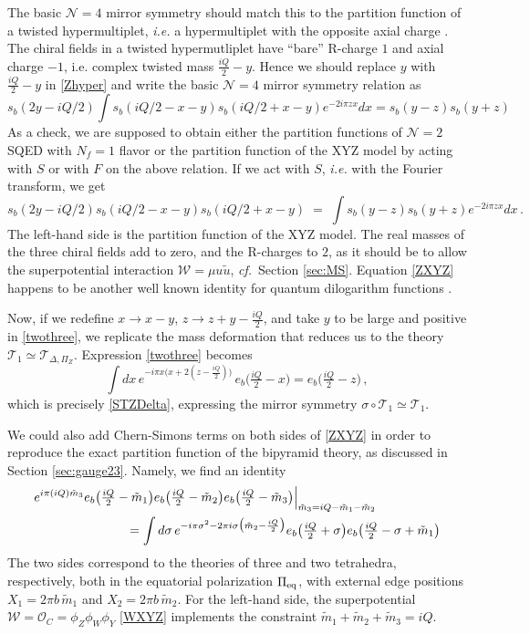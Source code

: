 \documentclass[hyper,letterpaper]{JHEP3}
\numberwithin{equation}{section}
\newcommand{\be}{\begin{equation}}
\newcommand{\ee}{\end{equation}}
\newcommand{\cf}{\emph{cf.}}
\newcommand{\CN}{\mathcal{N}}
\newcommand{\CO}{\mathcal{O}}
\newcommand{\CT}{\mathcal{T}}
\newcommand{\CW}{\mathcal{W}}
\begin{document}
The basic $\CN=4$ mirror symmetry should match this to the partition function of a twisted hypermultiplet,
{\it i.e.} a hypermultiplet with the opposite axial charge \cite{IS}.
The chiral fields in a twisted hypermutliplet have ``bare'' R-charge $1$ and axial charge $-1$, i.e. complex twisted mass $\tfrac{iQ}{2} -y$.
Hence we should replace $y$ with $\tfrac{iQ}{2}-y$ in \eqref{Zhyper}
and write the basic $\CN=4$ mirror symmetry relation as
%
\begin{equation} \label{twothree}
s_b(2 y - i Q/2) \int s_b(i Q/2-x -y) s_b(i Q/2+x -y) e^{- 2 i \pi z x } dx = s_b(y-z) s_b(y+z)
\end{equation}
%
As a check, we are supposed to obtain either the partition functions of $\CN=2$ SQED with $N_f=1$ flavor
or the partition function of the XYZ model by acting with $S$ or with $F$ on the above relation.
If we act with $S$, {\it i.e.} with the Fourier transform, we get
%
\begin{equation}
s_b(2 y - i Q/2)  s_b(i Q/2-x -y) s_b(i Q/2+x -y) \; = \; \int s_b(y-z) s_b(y+z) e^{- 2 i \pi z x }  dx \,. \label{ZXYZ}
\end{equation}
%
The left-hand side is the partition function of the XYZ model. The real masses of the three chiral fields
add to zero, and the R-charges to $2$, as it should be to allow the superpotential interaction $\CW = \mu u\tilde u$, \cf\ Section \ref{sec:MS}. Equation \eqref{ZXYZ} happens to be another well known identity for quantum dilogarithm functions \cite{FKV, PonsotTeschner}.

Now, if we redefine $x\to x-y$, $z\to z+y-\tfrac{iQ}{2}$, and take $y$ to be large and positive in \eqref{twothree}, we replicate the mass deformation that reduces us to the theory $\CT_1 \simeq \CT_{\Delta,\Pi_Z}$. Expression \eqref{twothree} becomes
%
\be \int dx\, e^{-i\pi x\big(x+2(z-\frac{iQ}{2})\big)}\,e_b\big(\tfrac{iQ}{2}-x\big) = e_b\big(\tfrac{iQ}{2}-z\big)\,,\ee
%
which is precisely \eqref{STZDelta}, expressing the mirror symmetry $\sigma\circ \CT_1 \simeq  \CT_1$.


We could also add Chern-Simons terms on both sides of \eqref{ZXYZ} in order to reproduce the exact partition function of the bipyramid theory, as discussed in Section \ref{sec:gauge23}. Namely, we find an identity
%
\begin{align} & e^{i\pi (i Q)\tilde m_3}e_b\big(\tfrac{iQ}{2}-\tilde m_1\big)e_b\big(\tfrac{iQ}{2}-\tilde m_2\big)e_b\big(\tfrac{iQ}{2}-\tilde m_3\big)\Big|_{\tilde m_3=iQ-\tilde m_1-\tilde m_2} \\
 &\hspace{1in} =\int d\sigma\, e^{-i\pi \sigma^2-2\pi i\sigma\big(\tilde m_2-\frac{iQ}{2}\big)}e_b\big(\tfrac{iQ}{2}+\sigma\big)e_b\big(\tfrac{iQ}{2}-\sigma+\tilde m_1\big)
\notag \end{align}
%
The two sides correspond to the theories of three and two tetrahedra, respectively, both in the equatorial polarization $\Pi_{\rm eq}$, with external edge positions $X_1 = 2\pi b\, \tilde m_1$ and $X_2=2\pi b\,\tilde m_2$. For the left-hand side, the superpotential $\CW = \CO_C = \phi_Z\phi_W\phi_Y$ \eqref{WXYZ} implements the constraint $\tilde m_1+\tilde m_2+\tilde m_3=iQ$.
\end{document}
